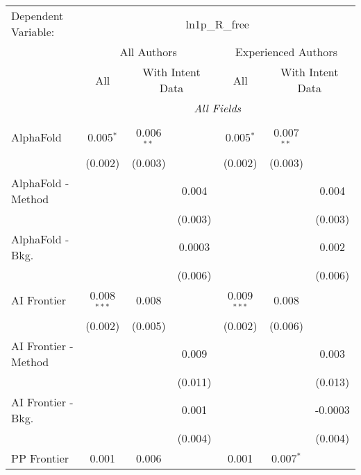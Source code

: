 \begingroup
\centering
\begin{tabular}{lcccccc}
   \tabularnewline \midrule \midrule
   Dependent Variable: & \multicolumn{6}{c}{ln1p\_R\_free}\\
 & \multicolumn{3}{c}{All Authors} & \multicolumn{3}{c}{Experienced Authors} \\
\cmidrule(lr){2-4} \cmidrule(lr){5-7}
 & \multicolumn{1}{c}{All} & \multicolumn{2}{c}{With Intent Data} & \multicolumn{1}{c}{All} & \multicolumn{2}{c}{With Intent Data} \\
\cmidrule(lr){2-2} \cmidrule(lr){3-4} \cmidrule(lr){5-5} \cmidrule(lr){6-7}
 & \multicolumn{6}{c}{\textit{All Fields}} \\ \\
   AlphaFold            & 0.005$^{*}$   & 0.006$^{**}$ &         & 0.005$^{*}$   & 0.007$^{**}$ &   \\   
                        & (0.002)       & (0.003)      &         & (0.002)       & (0.003)      &   \\   
   AlphaFold - Method   &               &              & 0.004   &               &              & 0.004\\   
                        &               &              & (0.003) &               &              & (0.003)\\   
   AlphaFold - Bkg.     &               &              & 0.0003  &               &              & 0.002\\   
                        &               &              & (0.006) &               &              & (0.006)\\   
   AI Frontier          & 0.008$^{***}$ & 0.008        &         & 0.009$^{***}$ & 0.008        &   \\   
                        & (0.002)       & (0.005)      &         & (0.002)       & (0.006)      &   \\   
   AI Frontier - Method &               &              & 0.009   &               &              & 0.003\\   
                        &               &              & (0.011) &               &              & (0.013)\\   
   AI Frontier - Bkg.   &               &              & 0.001   &               &              & -0.0003\\   
                        &               &              & (0.004) &               &              & (0.004)\\   
   PP Frontier          & 0.001         & 0.006        &         & 0.001         & 0.007$^{*}$  &   \\   

\end{tabular}
